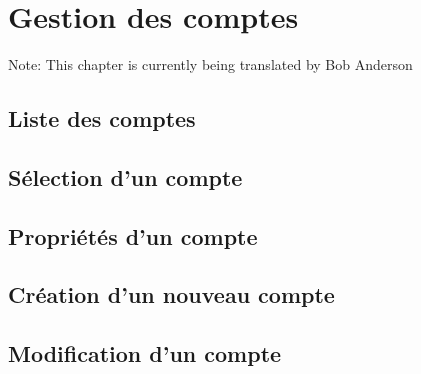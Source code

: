 
\chapter{Gestion des comptes\label{accounts} }

Note: This chapter is currently being translated by Bob Anderson 

\section{Liste des comptes\label{accounts-list}}


\section{Sélection d'un compte\label{accounts-selection}}

\section{Propriétés d'un compte\label{accounts-properties}}



\section{Création d'un nouveau compte\label{accounts-new}}



\section{Modification d'un compte\label{accounts-modify} }



